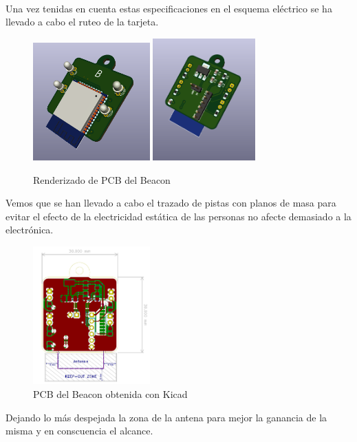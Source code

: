 \documentclass[a4paper ,12pt, onecolumn]{article}
\begin{document}
        \paragraph{}
        Una vez tenidas en cuenta estas especificaciones en el esquema eléctrico se ha llevado a cabo el ruteo de la tarjeta.
        \begin{center}
            \begin{figure}[ht]
                \centering
                \includegraphics[width=0.4\textwidth]{../emiter_1.PNG}
                \includegraphics[width=0.35\textwidth]{../emiter_2.PNG}
                \caption{Renderizado de PCB del Beacon}
                \label{fig:mesh8}
            \end{figure}    
        \end{center}
        Vemos que se han llevado a cabo el trazado de pistas con planos de masa para evitar el efecto de la 
        electricidad estática de las personas no afecte demasiado a la electrónica.
        \begin{center}
            \begin{figure}[ht]
                \centering
                \includegraphics[width=0.40\textwidth]{../emiter_PCB.PNG}
                \caption{PCB del Beacon obtenida con Kicad}
                \label{fig:mesh9}
            \end{figure}    
        \end{center}
        Dejando lo más despejada la zona de la antena para mejor la ganancia de la misma y en conscuencia el alcance.
\end{document}
